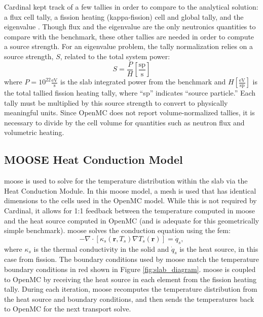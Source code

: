 \documentclass[letterpaper]{mc2023}
\begin{document}
Cardinal kept track of a few tallies in order to compare to the analytical solution: a flux cell tally, a fission heating (kappa-fission)
cell and global tally, and the eigenvalue \keff. Though flux and the eigenvalue are the only neutronics quantities to compare with the
benchmark, these other tallies are needed in order to compute a source strength. For an eigenvalue problem, the tally normalization relies
on a source strength, $S$, related to the total system power:
\begin{equation} \label{eq:source_strength}
   S = \frac{P}{H} \left[\frac{\textrm{sp}}{\textrm{s}} \right]
\end{equation}
where $P=10^{22} \frac{\textrm{eV}}{\textrm{s}}$ is the slab integrated power from the benchmark and $H \left[\frac{\textrm{eV}}{\textrm{sp}} \right]$
is the total tallied fission heating tally, where ``sp'' indicates ``source particle.'' Each tally must be multiplied by this source strength to
convert to physically meaningful units. Since OpenMC does not report volume-normalized tallies, it is necessary to divide by the cell volume
for quantities such as neutron flux and volumetric heating.

\subsection{MOOSE Heat Conduction Model}
\gls{moose} is used to solve for the temperature distribution within the slab via the Heat Conduction Module. In this \gls{moose}
model, a mesh is used that has identical dimensions to the cells used in the OpenMC model. While this is not required by Cardinal,
it allows for 1:1 feedback between the temperature computed in \gls{moose} and the heat source computed in OpenMC (and is
adequate for this geometrically simple benchmark). \gls{moose} solves the conduction equation using the \gls{fem}:
\begin{equation}\label{eq:conduction}
    - \nabla \cdot [\kappa_{s}(\mathbf{r},T_{s}) \nabla T_{s}(\mathbf{r})] = \dot{q}_{s},
\end{equation}
where $\kappa_{s}$ is the thermal conductivity in the solid and $\dot{q}_{s}$ is the heat source, in this case from fission. The
boundary conditions used by \gls{moose} match the temperature boundary conditions in red shown in Figure \ref{fig:slab_diagram}.
\gls{moose} is coupled to OpenMC by receiving the heat source in each element from the fission heating tally. During each iteration,
\gls{moose} recomputes the temperature distribution from the heat source and boundary conditions, and then sends the temperatures
back to OpenMC for the next transport solve.
\end{document}
